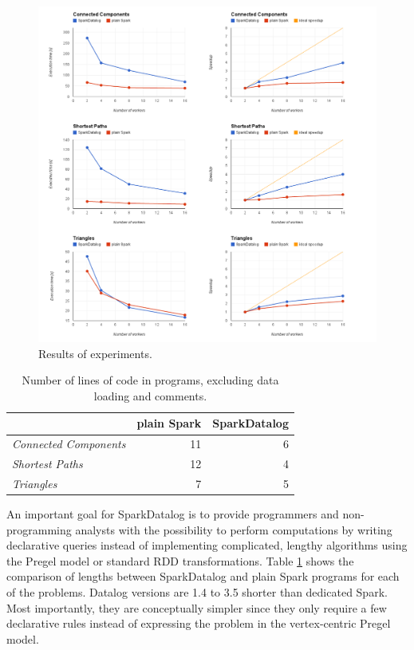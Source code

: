 \begin{figure}[!htbp]
  \centering
    \includegraphics[width=\textwidth]{images/plots_all.png}
   \caption{Results of experiments. \label{img_plots_exp}}
\end{figure}


\begin{table}[!htbp]
  \centering
\begin{tabular}{|l|r|r|}
\hline   & \textbf{plain Spark} & \textbf{SparkDatalog} \\ 
\hline
 \textit{Connected Components} & 11 & 6 \\ 
 \textit{Shortest Paths} & 12 & 4 \\ 
 \textit{Triangles} & 7 & 5 \\ 
\hline 
\end{tabular} 
\caption{Number of lines of code in programs, excluding data loading and comments.}
\label{tab_proglen}
\end{table}

An important goal for SparkDatalog is to provide programmers and non-programming analysts with the possibility to perform computations by writing declarative queries instead of implementing complicated, lengthy algorithms using the Pregel model or standard RDD transformations. Table \ref{tab_proglen} shows the comparison of lengths between SparkDatalog and plain Spark programs for each of the problems. Datalog versions are 1.4 to 3.5 shorter than dedicated Spark. Most importantly, they are conceptually simpler since they only require a few declarative rules instead of expressing the problem in the vertex-centric Pregel model.

